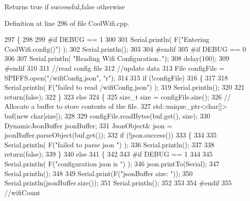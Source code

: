 \begin{DoxyReturn}{Returns}
true if successful,false otherwise 
\end{DoxyReturn}


Definition at line 296 of file Cool\+Wifi.\+cpp.


\begin{DoxyCode}
297 \{
298 
299 \textcolor{preprocessor}{#if DEBUG == 1 }
300 
301     Serial.println( F(\textcolor{stringliteral}{"Entering CoolWifi.config()"}) );
302     Serial.println();
303 
304 \textcolor{preprocessor}{#endif}
305 \textcolor{preprocessor}{#if DEBUG == 0}
306 
307     Serial.println( \textcolor{stringliteral}{"Reading Wifi Configuration.."});
308     delay(100);
309 \textcolor{preprocessor}{#endif }
310 
311     \textcolor{comment}{//read config file}
312     \textcolor{comment}{//update data}
313     File configFile = SPIFFS.open(\textcolor{stringliteral}{"/wifiConfig.json"}, \textcolor{stringliteral}{"r"});
314 
315     \textcolor{keywordflow}{if} (!configFile) 
316     \{
317     
318         Serial.println( F(\textcolor{stringliteral}{"failed to read /wifiConfig.json"}) );
319         Serial.println();
320 
321         \textcolor{keywordflow}{return}(\textcolor{keyword}{false});
322     \}
323     \textcolor{keywordflow}{else}
324     \{
325         \textcolor{keywordtype}{size\_t} size = configFile.size();
326         \textcolor{comment}{// Allocate a buffer to store contents of the file.}
327         std::unique\_ptr<char[]> buf(\textcolor{keyword}{new} \textcolor{keywordtype}{char}[size]);
328 
329         configFile.readBytes(buf.get(), size);
330         DynamicJsonBuffer jsonBuffer;
331         JsonObject& json = jsonBuffer.parseObject(buf.get());
332         \textcolor{keywordflow}{if} (!json.success()) 
333         \{
334 
335             Serial.println( F(\textcolor{stringliteral}{"failed to parse json "}) );
336             Serial.println();
337 
338             \textcolor{keywordflow}{return}(\textcolor{keyword}{false});
339         \} 
340         \textcolor{keywordflow}{else}
341         \{
342         
343 \textcolor{preprocessor}{        #if DEBUG == 1 }
344         
345             Serial.println( F(\textcolor{stringliteral}{"configuration json is "}) );
346             json.printTo(Serial);
347             Serial.println();
348 
349             Serial.print(F(\textcolor{stringliteral}{"jsonBuffer size: "}));
350             Serial.println(jsonBuffer.size());
351             Serial.println();
352 
353 
354 \textcolor{preprocessor}{        #endif}
355             \textcolor{comment}{//wifiCount}

\end{DoxyCode}
